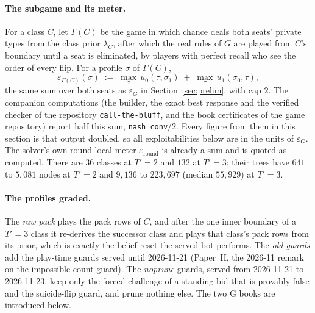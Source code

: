 \documentclass[11pt]{article}
\theoremstyle{plain}
\theoremstyle{definition}
\theoremstyle{remark}
\newcommand{\code}[1]{\texttt{\small #1}}
\newcommand{\game}{\ensuremath{G}}
\newcommand{\epsG}{\ensuremath{\varepsilon_{\game}}}
\begin{document}
\paragraph{The subgame and its meter.} For a class $C$, let
$\Gamma(C)$ be the game in which chance deals both seats' private types
from the class prior $\lambda_C$, after which the real rules of $\game$
are played from $C$'s boundary until a seat is eliminated, by players
with perfect recall who see the order of every flip. For a profile
$\sigma$ of $\Gamma(C)$,
\[
\varepsilon_{\Gamma(C)}(\sigma) \;:=\; \max_{\tau}\, u_0(\tau,\sigma_1)
\;+\; \max_{\tau}\, u_1(\sigma_0,\tau),
\]
the same sum over both seats as $\epsG$ in Section~\ref{sec:prelim},
with cap $2$. The companion computations (the builder, the exact best
response and the verified checker of the repository
\code{call-the-bluff}, and the book certificates of the game repository)
report half this sum, \texttt{nash\_conv}$/2$. Every figure from them
in this section is that output doubled, so all exploitabilities below
are in the units of $\epsG$. The solver's own round-local meter
$\varepsilon_{\text{round}}$ is already a sum and is quoted as
computed. There are $36$ classes at $T'=2$ and $132$ at $T'=3$; their
trees have $641$ to $5{,}081$ nodes at $T'=2$ and $9{,}136$ to
$223{,}697$ (median $55{,}929$) at $T'=3$.

\paragraph{The profiles graded.} The \emph{raw pack} plays the pack rows
of $C$, and after the one inner boundary of a $T'=3$ class it re-derives
the successor class and plays that class's pack rows from its prior,
which is exactly the belief reset the served bot performs. The
\emph{old guards} add the play-time guards served until 2026-11-21
(Paper~II, the 2026-11 remark on the impossible-count guard). The
\emph{noprune} guards, served from 2026-11-21 to 2026-11-23, keep only the forced
challenge of a standing bid that is provably false and the suicide-flip
guard, and prune nothing else. The two G books are introduced below.
\end{document}
